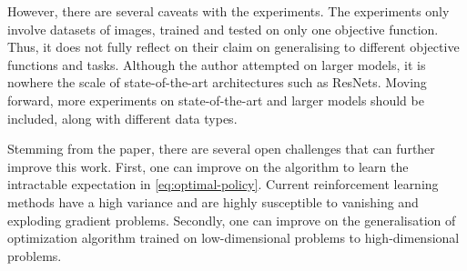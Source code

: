 \documentclass{article}
\begin{document}
However, there are several caveats with the experiments. The experiments only involve datasets of images, trained and tested on only one objective function. Thus, it does not fully reflect on their claim on generalising to different objective functions and tasks. Although the author attempted on larger models, it is nowhere the scale of state-of-the-art architectures such as ResNets. Moving forward, more experiments on state-of-the-art and larger models should be included, along with different data types.

Stemming from the paper, there are several open challenges that can further improve this work. First, one can improve on the algorithm to learn the intractable expectation in \cref{eq:optimal-policy}. Current reinforcement learning methods have a high variance and are highly susceptible to vanishing and exploding gradient problems. Secondly, one can improve on the generalisation of optimization algorithm trained on low-dimensional problems to high-dimensional problems.

\printbibliography
\end{document}
